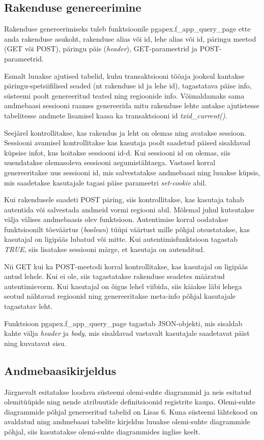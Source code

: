 \documentclass[a4paper,12pt]{article} %
\begin{document}
\subsection{Rakenduse genereerimine}
Rakenduse genereerimiseks tuleb  funktsioonile pgapex.f\_app\_query\_page ette anda rakenduse asukoht, rakenduse alias või id, lehe alias või id, päringu meetod (GET või POST), päringu päis (\textit{header}), GET-parameetrid ja POST-parameetrid.\par
Esmalt luuakse ajutised tabelid, kuhu transaktsiooni tööaja jooksul kantakse päringu-spetsiifilised seaded (nt rakenduse id ja lehe id), tagastatava päise info, süsteemi poolt genereeritud teated ning regioonide info.
Võimaldamaks sama andmebaasi sessiooni raames genereerida mitu rakenduse lehte antakse ajutistesse tabelitesse andmete lisamisel kaasa ka transaktsiooni id \textit{txid\_current()}.\par
Seejärel kontrollitakse, kas rakendus ja leht on olemas ning avatakse sessioon.
Sessiooni avamisel kontrollitakse kas kasutaja poolt saadetud päised sisaldavad küpsise infot, kus hoitakse sessiooni id-d. Kui sessiooni id on olemas, siis uuendatakse olemasoleva sessiooni aegumistähtaega. Vastasel korral genereeritakse uus sessiooni id, mis salvestatakse andmebaasi ning luuakse küpsis, mis saadetakse kasutajale tagasi päise parameetri \textit{set-cookie} abil.\par
Kui rakendusele saadeti POST päring, siis kontrollitakse, kas kasutaja tahab autentida või salvestada andmeid vormi regiooni abil. Mõlemal juhul kutsutakse välja välises andmebaasis olev funktsioon. Autentimise korral oodatakse funktsioonilt tõeväärtus (\textit{boolean}) tüüpi väärtust mille põhjal otsustatakse, kas kasutajal on ligipääs lubatud või mitte. Kui autentimisfunktsioon tagastab \textit{TRUE}, siis lisatakse sessiooni märge, et kasutaja on autenditud.\par
Nii GET kui ka POST-meetodi korral kontrollitakse, kas kasutajal on ligipääs antud lehele. Kui ei ole, siis tagastatakse rakenduse seadetes määratud autentimisvorm. Kui kasutajal on õigus lehel viibida, siis käiakse läbi lehega seotud nähtavad regioonid ning genereeritakse meta-info põhjal kasutajale tagastatav leht.\par
Funktsioon pgapex.f\_app\_query\_page tagastab JSON-objekti, mis sisaldab kahte välja \textit{header} ja \textit{body}, mis sisaldavad vastavalt kasutajale saadetavat päist ning kuvatavat sisu.

\subsection{Andmebaasikirjeldus}
Järgnevalt esitatakse loodava süsteemi olemi-suhte diagrammid ja neis esitatud olemitüüpide ning nende atribuutide definitsioonid registrite kaupa. Olemi-suhte diagrammide põhjal genereeritud tabelid on Lisas 6. Kuna süsteemi lähtekood on avaldatud ning andmebaasi tabelite kirjeldus luuakse olemi-suhte diagrammide põhjal, siis kasutatakse olemi-suhte diagrammides inglise keelt.
\end{document}
